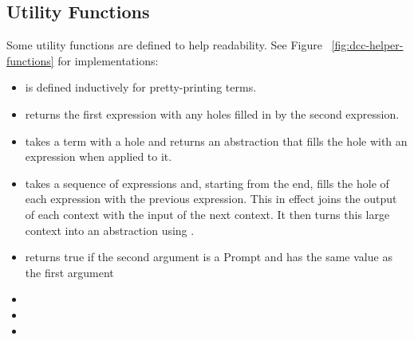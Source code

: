 \begin{Shaded}
\begin{Highlighting}[]
  \FunctionTok{=}    \NormalTok{[}\NormalTok{] }
\end{Highlighting}
\end{Shaded}

\subsection{Utility Functions}
Some utility functions are defined to help readability. See Figure ~\ref{fig:dcc-helper-functions} for implementations:

\begin{itemize}\itemsep0.1cm

\item {} is defined inductively for pretty-printing terms.

\item {} returns the first expression with any holes filled in by the second expression.

\item {} takes a term with a hole and returns an abstraction that fills the hole with an expression when applied to it.

\item {} takes a sequence of expressions and, starting from the end, fills the hole of each expression with the previous expression. This in effect joins the output of each context with the input of the next context. It then turns this large context into an abstraction using .

\item {} returns true if the second argument is a Prompt and has the same value as the first argument

\item {} 
\item {}
\item {}

\end{itemize}

